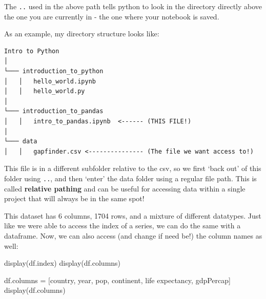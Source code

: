 \documentclass[
  letterpaper,
  DIV=11,
  numbers=noendperiod]{scrreprt}
\newenvironment{Shaded}{\begin{snugshade}}{\end{snugshade}}
\newcommand{\NormalTok}[1]{\textcolor[rgb]{0.00,0.23,0.31}{#1}}
\newcommand{\OperatorTok}[1]{\textcolor[rgb]{0.37,0.37,0.37}{#1}}
\newcommand{\StringTok}[1]{\textcolor[rgb]{0.13,0.47,0.30}{#1}}
\begin{document}
\begin{tcolorbox}[enhanced jigsaw, rightrule=.15mm, opacitybacktitle=0.6, colback=white, toprule=.15mm, colframe=quarto-callout-tip-color-frame, bottomtitle=1mm, bottomrule=.15mm, arc=.35mm, coltitle=black, breakable, title=\textcolor{quarto-callout-tip-color}{\faLightbulb}\hspace{0.5em}{.. ?}, titlerule=0mm, opacityback=0, colbacktitle=quarto-callout-tip-color!10!white, left=2mm, toptitle=1mm, leftrule=.75mm]
The \texttt{..} used in the above path tells python to look in the
directory directly above the one you are currently in - the one where
your notebook is saved.

As an example, my directory structure looks like:

\begin{verbatim}
Intro to Python
│
└─── introduction_to_python
│   │   hello_world.ipynb
│   │   hello_world.py
│   
└─── introduction_to_pandas
│   │   intro_to_pandas.ipynb  <------ (THIS FILE!)
│
└─── data
│   │   gapfinder.csv <--------------- (The file we want access to!)
\end{verbatim}

This file is in a different subfolder relative to the csv, so we first
`back out' of this folder using \texttt{..}, and then `enter' the data
folder using a regular file path. This is called \textbf{relative
pathing} and can be useful for accessing data within a single project
that will always be in the same spot!
\end{tcolorbox}

This dataset has 6 columns, 1704 rows, and a mixture of different
datatypes. Just like we were able to access the index of a series, we
can do the same with a dataframe. Now, we can also access (and change if
need be!) the column names as well:

\begin{Shaded}
\begin{Highlighting}[]
\NormalTok{display(df.index)}
\NormalTok{display(df.columns)}

\NormalTok{df.columns }\OperatorTok{=}\NormalTok{ [}\StringTok{\textquotesingle{}country\textquotesingle{}}\NormalTok{, }\StringTok{\textquotesingle{}year\textquotesingle{}}\NormalTok{, }\StringTok{\textquotesingle{}pop\textquotesingle{}}\NormalTok{, }\StringTok{\textquotesingle{}continent\textquotesingle{}}\NormalTok{, }\StringTok{\textquotesingle{}life expectancy\textquotesingle{}}\NormalTok{, }\StringTok{\textquotesingle{}gdpPercap\textquotesingle{}}\NormalTok{]}
\NormalTok{display(df.columns)}
\end{Highlighting}
\end{Shaded}
\end{document}
